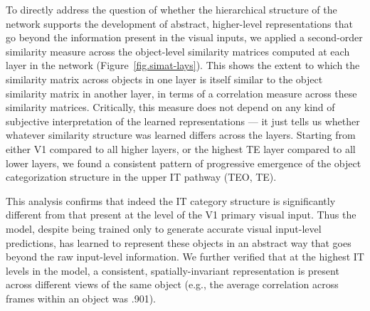 \documentclass[11pt,twoside]{article}
\newif\myifpdf
\begin{document}
To directly address the question of whether the hierarchical structure of the network supports the development of abstract, higher-level representations that go beyond the information present in the visual inputs, we applied a second-order similarity measure across the object-level similarity matrices computed at each layer in the network (Figure~\ref{fig.simat-lays}).  This shows the extent to which the similarity matrix across objects in one layer is itself similar to the object similarity matrix in another layer, in terms of a correlation measure across these similarity matrices.  Critically, this measure does not depend on any kind of subjective interpretation of the learned representations --- it just tells us whether whatever similarity structure was learned differs across the layers.  Starting from either V1 compared to all higher layers, or the highest TE layer compared to all lower layers, we found a consistent pattern of progressive emergence of the object categorization structure in the upper IT pathway (TEO, TE).

This analysis confirms that indeed the IT category structure is significantly different from that present at the level of the V1 primary visual input.  Thus the model, despite being trained only to generate accurate visual input-level predictions, has learned to represent these objects in an abstract way that goes beyond the raw input-level information.  We further verified that at the highest IT levels in the model, a consistent, spatially-invariant representation is present across different views of the same object (e.g., the average correlation across frames within an object was .901).
\end{document}
